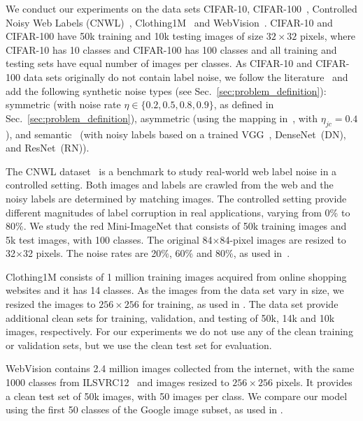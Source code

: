 \documentclass{bmvc2k}
\begin{document}
We conduct our experiments on the data sets  CIFAR-10, CIFAR-100~\citep{krizhevsky2009learning}, Controlled Noisy Web Labels (CNWL)~\citep{jiang2020beyond}, Clothing1M~\citep{xiao2015learning}  and  WebVision~\citep{webvision}. CIFAR-10 and CIFAR-100 have 50k training and 10k testing images of size $32 \times 32$ pixels, where CIFAR-10 has 10 classes and CIFAR-100 has 100 classes and all training and testing sets have equal number of images per classes. 
As CIFAR-10 and CIFAR-100 data sets originally do not contain label noise, we follow the literature~\citep{DivideMix} and add  the following synthetic noise types (see Sec.~\ref{sec:problem_definition}): symmetric (with noise rate $\eta \in \{0.2, 0.5, 0.8, 0.9\}$, as defined in Sec.~\ref{sec:problem_definition}), asymmetric (using the mapping  in~\citep{DivideMix, patrini2017making}, with $\eta_{jc}=0.4$), and semantic~\citep{rog} (with noisy labels based on a trained VGG~\citep{vgg}, DenseNet~(DN), and ResNet~(RN)). 

 The CNWL dataset~\citep{jiang2020beyond} is a benchmark to study real-world web label noise in a controlled setting. Both images and labels are crawled from the web and the noisy labels are determined by matching images. The controlled setting provide different magnitudes of label corruption in real applications, varying from 0\% to 80\%. We study the red Mini-ImageNet that consists of 50k training images and 5k test images, with 100 classes. 
 The original 84$\times$84-pixel images are resized to 32$\times$32 pixels. 
 The noise rates are 20\%, 60\% and 80\%, as used in~\citep{FaMUS}.
 
 Clothing1M consists of 1 million training images acquired from online shopping websites and it has 14 classes.
As the images from the data set vary in size, we resized the images to $256 \times 256$ for training, as used in \cite{DivideMix,han2019deep}.
The data set provide additional clean sets for 
training, validation, and testing of 50k, 14k and 10k images, respectively. For our experiments we do not use any of the clean training or validation sets, but we use the clean test set for evaluation.
 
 WebVision contains 2.4 million images collected from the internet, with the same 1000 classes from ILSVRC12~\citep{deng2009imagenet} and images resized  to $256 \times 256$ pixels. It provides a clean test set of 50k images, with 50 images per class. We compare our model using the first 50 classes of the Google image subset, as used in \cite{DivideMix, chen2019understanding}.
\end{document}
